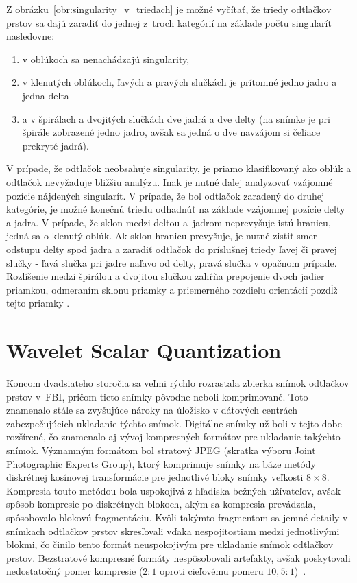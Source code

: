   Z obrázku~{\ref{obr:singularity_v_triedach}} je možné vyčítať, že triedy odtlačkov prstov sa dajú zaradiť do jednej z~troch kategórií na základe počtu
  singularít nasledovne:
  \begin{enumerate}
    \item v oblúkoch sa nenachádzajú singularity,
    \item v klenutých oblúkoch, ľavých a pravých slučkách je prítomné jedno jadro a jedna delta
    \item a v špirálach a dvojitých slučkách dve jadrá a dve delty (na snímke je pri špirále zobrazené jedno jadro, avšak sa jedná o dve navzájom si čeliace
    prekryté jadrá).
  \end{enumerate}
  V prípade, že odtlačok neobsahuje singularity, je priamo klasifikovaný ako oblúk a odtlačok nevyžaduje bližšiu analýzu. Inak je nutné ďalej analyzovať
  vzájomné pozície nájdených singularít. V prípade, že bol odtlačok zaradený do druhej kategórie, je možné konečnú triedu odhadnúť na základe vzájomnej pozície
  delty a jadra. V prípade, že sklon medzi deltou a~jadrom neprevyšuje istú hranicu, jedná sa o klenutý oblúk. Ak sklon hranicu prevyšuje, je nutné zistiť smer
  odstupu delty spod jadra a zaradiť odtlačok do príslušnej triedy ľavej či pravej slučky - ľavá slučka pri jadre naľavo od delty, pravá slučka v opačnom
  prípade. Rozlíšenie medzi špirálou a dvojitou slučkou zahŕňa prepojenie dvoch jadier priamkou, odmeraním sklonu priamky a priemerného rozdielu orientácií
  pozdĺž tejto priamky \cite{Handbook}.

\chapter{Wavelet Scalar Quantization} \label{kap:wsq}
  Koncom dvadsiateho storočia sa veľmi rýchlo rozrastala zbierka snímok odtlačkov prstov v~FBI, pričom tieto snímky pôvodne neboli komprimované.
  Toto znamenalo stále sa zvyšujúce nároky na úložisko v dátových centrách zabezpečujúcich ukladanie týchto snímok. Digitálne snímky už boli v tejto dobe
  rozšírené, čo znamenalo aj vývoj kompresných formátov pre ukladanie takýchto snímok. Významným formátom bol stratový JPEG (skratka výboru Joint Photographic
  Experts Group), ktorý komprimuje snímky na báze metódy diskrétnej kosínovej transformácie pre jednotlivé bloky snímky veľkosti $8 \times{} 8$. Kompresia touto
  metódou bola uspokojivá z hľadiska bežných užívateľov, avšak spôsob kompresie po diskrétnych blokoch, akým sa kompresia prevádzala, spôsobovalo blokovú
  fragmentáciu. Kvôli takýmto fragmentom sa jemné detaily v snímkach odtlačkov prstov skresľovali vďaka nespojitostiam medzi jednotlivými blokmi,
  čo činilo tento formát neuspokojivým pre ukladanie snímok odtlačkov prstov. Bezstratové kompresné formáty nespôsobovali artefakty, avšak poskytovali
  nedostatočný pomer kompresie ($2:1$ oproti cieľovému pomeru $10,5:1$)~{\cite{Handbook}}.
  
